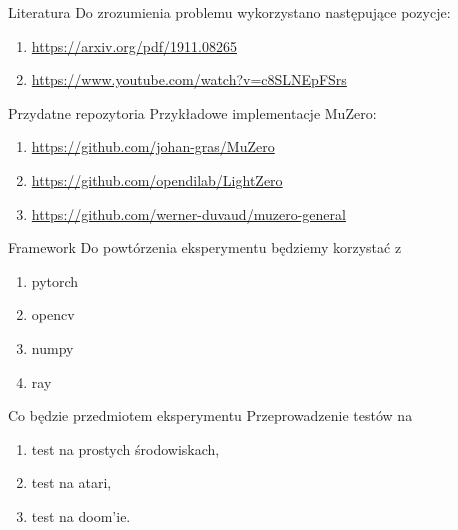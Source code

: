 
\begin{frame}{Literatura}
  Do zrozumienia problemu wykorzystano następujące pozycje:
    \begin{enumerate}
      \item \url{https://arxiv.org/pdf/1911.08265}
      \item \url{https://www.youtube.com/watch?v=c8SLNEpFSrs}
    \end{enumerate}
\end{frame}
\begin{frame}{Przydatne repozytoria}
  Przykładowe implementacje MuZero:
  \begin{enumerate}
    \item \url{https://github.com/johan-gras/MuZero}
    \item \url{https://github.com/opendilab/LightZero}
    \item \url{https://github.com/werner-duvaud/muzero-general}
  \end{enumerate}
\end{frame}
\begin{frame}{Framework}
  Do powtórzenia eksperymentu będziemy korzystać z 
  \begin{enumerate}[<+->]
    \item pytorch
    \item opencv
    \item numpy
    \item ray
  \end{enumerate}
\end{frame}
\begin{frame}{Co będzie przedmiotem eksperymentu}
  Przeprowadzenie testów na 
  \begin{enumerate}[<+->]
    \item test na prostych środowiskach,
    \item test na atari,
    \item test na doom'ie.
  \end{enumerate}
\end{frame}
